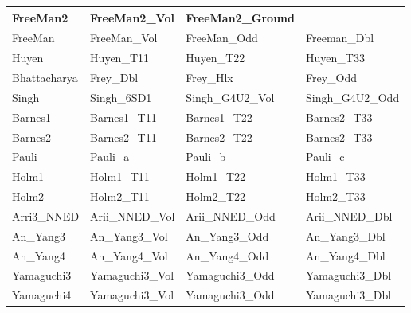 \documentclass[a4paper,12pt]{spieman}  %
\begin{document}
\begin{spacing}{1}
\begin{table}[h!]
\begin{tabular}{|l|lll|}
FreeMan2\citep{4276884}              & FreeMan2\_Vol       & FreeMan2\_Ground    &                   \\ \hline
FreeMan\cite{673687}                 & FreeMan\_Vol        & FreeMan\_Odd        & Freeman\_Dbl      \\ \hline
Huyen\cite{huynen1990stokes}         & Huyen\_T11          & Huyen\_T22          & Huyen\_T33        \\ \hline
Bhattacharya\citep{bhattacharya2015modifying}              & Frey\_Dbl           & Frey\_Hlx           & Frey\_Odd         \\ \hline
Singh\citep{singh2018model}                                 & Singh\_6SD1         & Singh\_G4U2\_Vol    & Singh\_G4U2\_Odd  \\ \hline
Barnes1\cite{barnes1988roll}          & Barnes1\_T11        & Barnes1\_T22        & Barnes2\_T33      \\ \hline
Barnes2\citep{barnes1988roll}         & Barnes2\_T11        & Barnes2\_T22        & Barnes2\_T33      \\ \hline
Pauli\citep{485127}                                 & Pauli\_a            & Pauli\_b            & Pauli\_c          \\ \hline
Holm1\citep{holm1988radar}           & Holm1\_T11          & Holm1\_T22          & Holm1\_T33        \\ \hline
Holm2\citep{holm1988radar}                                 & Holm2\_T11          & Holm2\_T22          & Holm2\_T33        \\ \hline
Arri3\_NNED\citep{5659970}           & Arii\_NNED\_Vol     & Arii\_NNED\_Odd     & Arii\_NNED\_Dbl   \\ \hline
An\_Yang3\citep{5437202}             & An\_Yang3\_Vol      & An\_Yang3\_Odd      & An\_Yang3\_Dbl    \\ \hline
An\_Yang4\citep{5872006}                             & An\_Yang4\_Vol      & An\_Yang4\_Odd      & An\_Yang4\_Dbl    \\ \hline
Yamaguchi3\citep{yamaguchi2013comparison}                      & Yamaguchi3\_Vol     & Yamaguchi3\_Odd     & Yamaguchi3\_Dbl   \\ \hline
Yamaguchi4\citep{1487628}                            & Yamaguchi3\_Vol     & Yamaguchi3\_Odd     & Yamaguchi3\_Dbl   \\ \hline
\end{tabular}
\label{decomp}
\end{table}
\egroup

\end{spacing}
\end{document}

